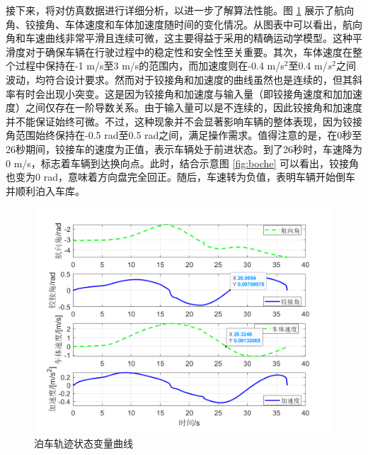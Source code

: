 \documentclass[master,academic]{ysuthesis} %
\begin{document}
		接下来，将对仿真数据进行详细分析，以进一步了解算法性能。图 \ref{fig:databochestate} 展示了航向角、铰接角、车体速度和车体加速度随时间的变化情况。从图表中可以看出，航向角和车速曲线非常平滑且连续可微，这主要得益于采用的精确运动学模型。这种平滑度对于确保车辆在行驶过程中的稳定性和安全性至关重要。其次，车体速度在整个过程中保持在-1 m/s至3 m/s的范围内，而加速度则在-0.4 m/s$^2$至0.4 m/$s^2$之间波动，均符合设计要求。然而对于铰接角和加速度的曲线虽然也是连续的，但其斜率有时会出现小突变。这是因为铰接角和加速度与输入量（即铰接角速度和加加速度）之间仅存在一阶导数关系。由于输入量可以是不连续的，因此铰接角和加速度并不能保证始终可微。不过，这种现象并不会显著影响车辆的整体表现，因为铰接角范围始终保持在-0.5 rad至0.5 rad之间，满足操作需求。值得注意的是，在0秒至26秒期间，铰接车的速度为正值，表示车辆处于前进状态。到了26秒时，车速降为0 m/s，标志着车辆到达换向点。此时，结合示意图 \ref{fig:boche} 可以看出，铰接角也变为0 rad，意味着方向盘完全回正。随后，车速转为负值，表明车辆开始倒车并顺利泊入车库。
		\begin{figure}[H]
			\centering
			\includegraphics[width=1\textwidth]{databochestate.png}
			\caption{泊车轨迹状态变量曲线}
			\label{fig:databochestate}
		\end{figure}
\end{document}
